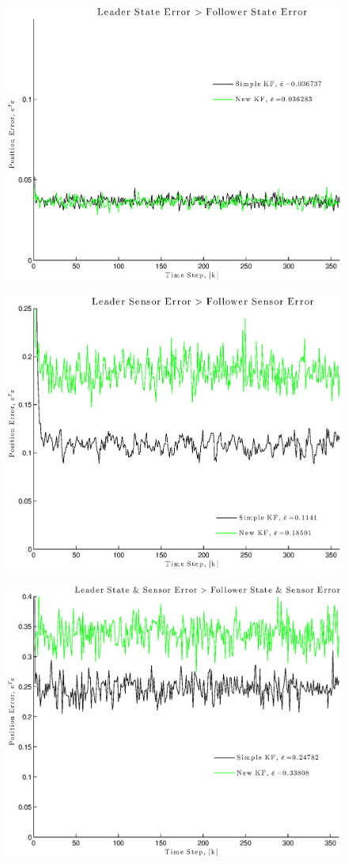 \documentclass[11pt]{article}
\begin{document}
\begin{figure}[!hbtp]
\centering
\includegraphics[scale=0.7]{fig4}
\end{figure}
\begin{figure}[!hbtp]
\centering
\includegraphics[scale=0.7]{fig5}
\end{figure}
\begin{figure}[!hbtp]
\centering
\includegraphics[scale=0.7]{fig6}
\end{figure}
\end{document}

